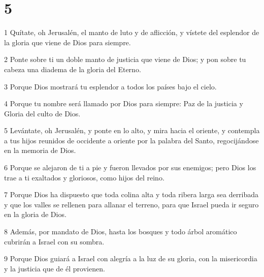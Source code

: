 \chapter{5}

\par 1 Quítate, oh Jerusalén, el manto de luto y de aflicción, y vístete del esplendor de la gloria que viene de Dios para siempre.
\par 2 Ponte sobre ti un doble manto de justicia que viene de Dios; y pon sobre tu cabeza una diadema de la gloria del Eterno.
\par 3 Porque Dios mostrará tu esplendor a todos los países bajo el cielo.
\par 4 Porque tu nombre será llamado por Dios para siempre: Paz de la justicia y Gloria del culto de Dios.
\par 5 Levántate, oh Jerusalén, y ponte en lo alto, y mira hacia el oriente, y contempla a tus hijos reunidos de occidente a oriente por la palabra del Santo, regocijándose en la memoria de Dios.
\par 6 Porque se alejaron de ti a pie y fueron llevados por sus enemigos; pero Dios los trae a ti exaltados y gloriosos, como hijos del reino.
\par 7 Porque Dios ha dispuesto que toda colina alta y toda ribera larga sea derribada y que los valles se rellenen para allanar el terreno, para que Israel pueda ir seguro en la gloria de Dios.
\par 8 Además, por mandato de Dios, hasta los bosques y todo árbol aromático cubrirán a Israel con su sombra.
\par 9 Porque Dios guiará a Israel con alegría a la luz de su gloria, con la misericordia y la justicia que de él provienen.

